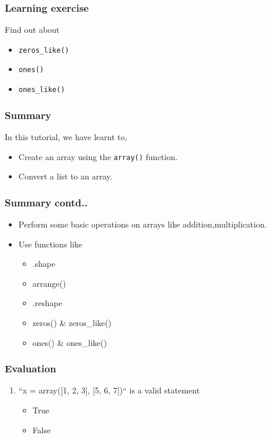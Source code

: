 \documentclass[17pt,compress]{beamer}
\newcounter{saveenumi}
\newcommand{\seti}{\setcounter{saveenumi}{\value{enumi}}}
\begin{document}
\begin{frame}
\frametitle{Learning exercise}
\label{sec-8}

  Find out about

\begin{itemize}
\item \texttt{zeros\_like()}
\item \texttt{ones()}
\item \texttt{ones\_like()}
\end{itemize}
\end{frame}
\begin{frame}
\frametitle{Summary}
\label{sec-9}

  In this tutorial, we have learnt to,

\begin{itemize}
\item Create an array using the \texttt{array()} function.
\item Convert a list to an array.
\end{itemize}
\end{frame}
\begin{frame}
\frametitle{Summary contd..}
\label{sec-9}

\begin{itemize}
\item Perform some basic operations on arrays like addition,multiplication.
\item Use functions like
	\begin{itemize}
	\item .shape
	\item arrange()
	\item .reshape
	\item zeros() \& zeros\_like()
	\item ones() \& ones\_like()
	\end{itemize}
\end{itemize}
\end{frame}
\begin{frame}
\frametitle{Evaluation}
\label{sec-10.1}


\begin{enumerate}
\item ``x = array([1, 2, 3], [5, 6, 7])`` is a valid statement
\begin{itemize}
\item True
\item False
\end{itemize}
\seti
\end{enumerate}
\end{frame}
\end{document}
